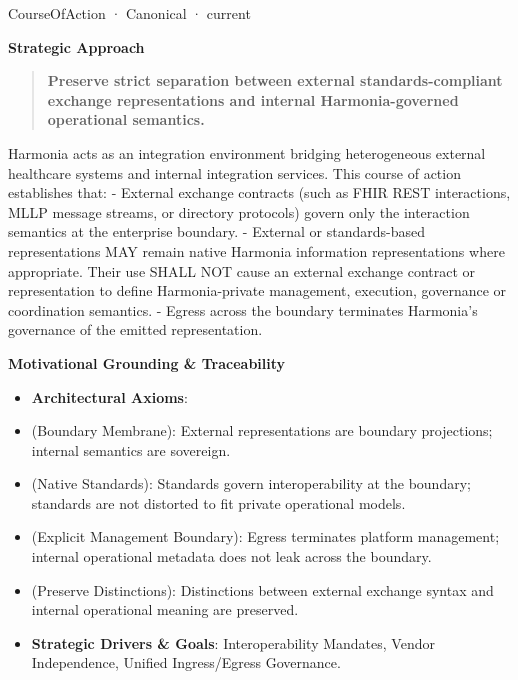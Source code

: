 \label{element:25d8509146fd4f2794a17f4a5253b7a3}
{\small CourseOfAction · Canonical · current}\par

\par\medskip\textbf{Strategic Approach}\par


\begin{quote}


\textbf{Preserve strict separation between external standards-compliant exchange representations and internal Harmonia-governed operational semantics.}



\end{quote}


Harmonia acts as an integration environment bridging heterogeneous external healthcare systems and internal integration services. This course of action establishes that:
- External exchange contracts (such as FHIR REST interactions, MLLP message streams, or directory protocols) govern only the interaction semantics at the enterprise boundary.
- External or standards-based representations MAY remain native Harmonia information representations where appropriate. Their use SHALL NOT cause an external exchange contract or representation to define Harmonia-private management, execution, governance or coordination semantics.
- Egress across the boundary terminates Harmonia's governance of the emitted representation.



\par\medskip\textbf{Motivational Grounding \& Traceability}\par


\begin{itemize}


\item \textbf{Architectural Axioms}:

\item \texttt{} (Boundary Membrane): External representations are boundary projections; internal semantics are sovereign.

\item \texttt{} (Native Standards): Standards govern interoperability at the boundary; standards are not distorted to fit private operational models.

\item \texttt{} (Explicit Management Boundary): Egress terminates platform management; internal operational metadata does not leak across the boundary.

\item \texttt{} (Preserve Distinctions): Distinctions between external exchange syntax and internal operational meaning are preserved.

\item \textbf{Strategic Drivers \& Goals}: Interoperability Mandates, Vendor Independence, Unified Ingress/Egress Governance.

\end{itemize}


